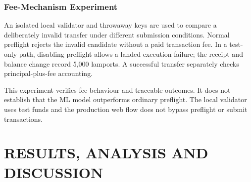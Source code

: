\documentclass[12pt,a4paper,oneside]{report}
\begin{document}
\subsection{Fee-Mechanism Experiment}
An isolated local validator and throwaway keys are used to compare a deliberately invalid transfer under different submission conditions. Normal preflight rejects the invalid candidate without a paid transaction fee. In a test-only path, disabling preflight allows a landed execution failure; the receipt and balance change record 5,000 lamports. A successful transfer separately checks principal-plus-fee accounting.

This experiment verifies fee behaviour and traceable outcomes. It does not establish that the ML model outperforms ordinary preflight. The local validator uses test funds and the production web flow does not bypass preflight or submit transactions.

\chapter{RESULTS, ANALYSIS AND DISCUSSION}
\end{document}
